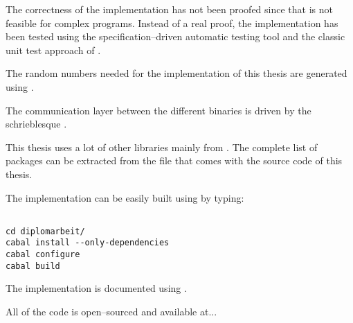 
The correctness of the implementation has not been proofed since that is not
feasible for complex programs. Instead of a real proof, the implementation
has been tested using the specification--driven automatic \JWThaskell{} testing
tool \JWTquickcheck{} \cite{quickcheck} and the classic unit test approach of
\JWTLhunit{}.



The random numbers needed for the implementation of this thesis are generated
using \JWTLmonadcryptorandom{}.



The communication layer between the different binaries is driven by the
schrieblesque \JWTXLprotobuf{}.



This thesis uses a lot of other libraries mainly from \JWTLhackage{}. The
complete list of packages can be extracted from the file
 that comes with the source code of this thesis.



The implementation can be easily built using \JWTLcabal{} by typing:

\begin{lstlisting}

cd diplomarbeit/
cabal install --only-dependencies
cabal configure
cabal build

\end{lstlisting}


%
%
\label{sec:implementation-doc}

The implementation is documented using \JWTLhaddock{}.



%
%
\label{sec:code-availability}

All of the code is open--sourced and available at...



